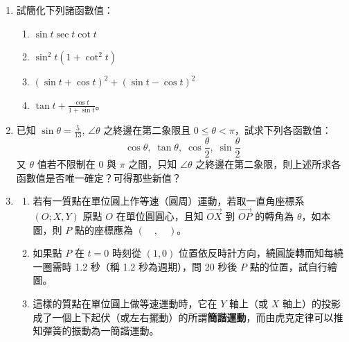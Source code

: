 \begin{enumerate}[label=\arabic*., leftmargin=2em]
  \begin{enumerate}[label=(\roman*), leftmargin=2.5em]
    \item $2\csc t = \frac{\sin t}{1 + \cos t} + \frac{1 + \cos t}{\sin t}$
    \item $\sec^2 t \csc^2 t = \sec^2 t + \csc^2 t$。
  \end{enumerate}
  \item 試簡化下列諸函數值：
  \begin{enumerate}[label=(\roman*), leftmargin=2.5em]
    \item $\sin t\sec t\cot t$
    \item $\sin^2 t(1 + \cot^2 t)$
    \item $(\sin t + \cos t)^2 + (\sin t - \cos t)^2$
    \item $\tan t + \frac{\cos t}{1 + \sin t}$。
  \end{enumerate}
  \item 已知 $\sin\theta = \frac{5}{13}$, $\angle\theta$ 之終邊在第二象限且 $0 \le \theta < \pi$，試求下列各函數值：
  \[ \cos\theta,\; \tan\theta,\; \cos\frac{\theta}{2},\; \sin\frac{\theta}{2} \]
  又 $\theta$ 值若不限制在 $0$ 與 $\pi$ 之間，只知 $\angle\theta$ 之終邊在第二象限，則上述所求各函數值是否唯一確定？可得那些新值？
  \item 
  \begin{enumerate}[label=(\roman*), leftmargin=2.5em]
    \item 若有一質點在單位圓上作等速（圓周）運動，若取一直角座標系 $(O; X, Y)$ 原點 $O$ 在單位圓圓心，且知 $\vec{OX}$ 到 $\vec{OP}$ 的轉角為 $\theta$，如本圖，則 $P$ 點的座標應為 $(\quad,\quad)$。
    \item 如果點 $P$ 在 $t=0$ 時刻從 $(1, 0)$ 位置依反時計方向，繞圓旋轉而知每繞一圈需時 1.2 秒（稱 1.2 秒為週期），問 20 秒後 $P$ 點的位置，試自行繪圖。
    \item 這樣的質點在單位圓上做等速運動時，它在 $Y$ 軸上（或 $X$ 軸上）的投影成了一個上下起伏（或左右擺動）的所謂\textbf{簡諧運動}，而由虎克定律可以推知彈簧的振動為一簡諧運動。
  \end{enumerate}
  \begin{center}
\end{center}
\end{enumerate}
